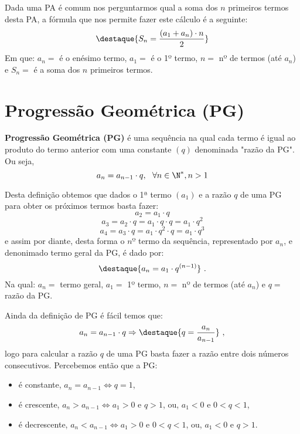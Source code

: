  Dada uma PA é comum nos perguntarmos qual a soma dos $n$ primeiros termos desta PA, a fórmula que nos permite fazer este cálculo é a seguinte:
 \[\destaque{S_n= \frac{(a_1 + a_n)\cdot n}{2}}\]
 Em que: $a_n=$ é o enésimo termo, $a_1=$ é o 1º termo, $n=$ nº de termos (até $a_n$) e $S_n=$ é a soma dos $n$ primeiros termos.



\section{Progressão Geométrica (PG)}

 \colorbox{azul}{
 \begin{minipage}{0.9\linewidth}
 \begin{center}
  \textbf{Progressão Geométrica (PG)} é uma sequência na qual cada termo é igual ao produto do termo anterior com uma constante $(q)$ denominada "razão da PG". Ou seja,
  \[a_{n}= a_{n-1} \cdot q, \ \ \forall n \in \N^{\ast}, n > 1\]
 \end{center}
 \end{minipage}}
 \vskip0.3cm

 Desta definição obtemos que dados o 1ª termo $(a_1)$ e a razão $q$ de uma PG para obter os próximos termos basta fazer:
 \[a_2= a_1 \cdot q\]
 \[a_3= a_2 \cdot q= a_1 \cdot q \cdot q= a_1 \cdot q^2\]
 \[a_4= a_3 \cdot q= a_1 \cdot q^2 \cdot q= a_1 \cdot q^3 \]
 e assim por diante, desta forma o $nº$ termo da sequência, representado por $a_n$, e denonimado termo geral da PG, é dado por:
 \[\destaque{a_n= a_1 \cdot q^{(n-1)}} \ .\]
 Na qual: $a_n=$ termo geral, $a_1=$ 1º termo, $n=$ nº de termos (até $a_n$) e $q=$ razão da PG.

 Ainda da definição de PG é fácil temos que:
 \[a_{n}= a_{n-1} \cdot q \Rightarrow
 \destaque{q= \frac{a_{n}}{ a_{n-1}}} \ ,\]
 logo para calcular a razão $q$ de uma PG basta fazer a razão entre dois números consecutivos. Percebemos então que a PG:
 \begin{itemize}
  \item é constante, $a_n= a_{n-1} \Leftrightarrow q= 1$,
  \item é crescente, $a_n > a_{n-1} \Leftrightarrow a_1 > 0$ e $q > 1$, ou, $a_1 < 0$ e $0 < q < 1$,
  \item é decrescente, $a_n < a_{n-1} \Leftrightarrow a_1 > 0$ e $0 < q < 1$, ou, $a_1 < 0$ e $q > 1$.
 \end{itemize}


